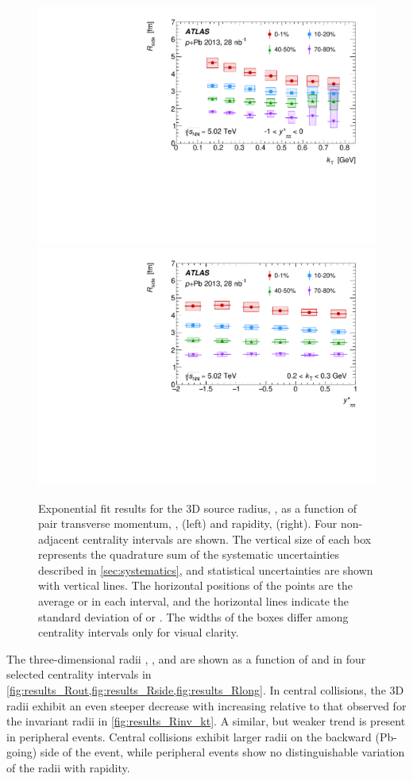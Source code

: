 \begin{figure}[ht]
\centering
\includegraphics[width=.49\linewidth]{canqosl_Rside_vs_kt.pdf}
\includegraphics[width=.49\linewidth]{canqosl_Rside_vs_kys.pdf}
\caption{Exponential fit results for the 3D source radius, \Rside, as a function of pair transverse momentum, \kt, (left) and rapidity, \kys (right). Four non-adjacent centrality intervals are shown. The vertical size of each box represents the quadrature sum of the systematic uncertainties described in \cref{sec:systematics}, and statistical uncertainties are shown with vertical lines. The horizontal positions of the points are the average \kt or \kys in each interval, and the horizontal lines indicate the standard deviation of \kt or \kys. The widths of the boxes differ among centrality intervals only for visual clarity.}
\label{fig:results_Rside}
\end{figure}


The three-dimensional radii \Rout, \Rside, and \Rlong are shown as a function of \kt and \kys in four selected centrality intervals in \cref{fig:results_Rout,fig:results_Rside,fig:results_Rlong}.
In central collisions, the 3D radii exhibit an even steeper decrease with increasing \kt relative to that observed for the invariant radii in \cref{fig:results_Rinv_kt}.
A similar, but weaker trend is present in peripheral events.
Central collisions exhibit larger radii on the backward (Pb-going) side of the event, while peripheral events show no distinguishable variation of the radii with rapidity.

